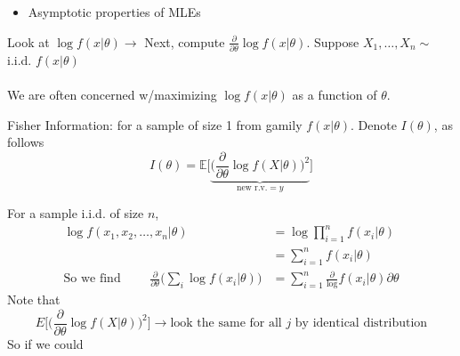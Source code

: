 \begin{itemize}
	\item Asymptotic properties of MLEs
\end{itemize}
Look at $\log f(x | \theta) \rightarrow$ Next, compute $\frac{\partial}{\partial \theta} \log f(x | \theta)$. \quad Suppose $X_1, \ldots, X_n \sim$ i.i.d. $f(x|\theta)$\\\\
We are often concerned w/maximizing $\log f(x|\theta)$ as a function of $\theta$.
\begin{definition}
	Fisher Information: for a sample of size 1 from gamily $f(x| \theta)$. Denote $I(\theta)$, as follows
	\begin{equation*}
		I(\theta) = \mathbb{E} \bigg[ \underbrace{\bigg( \frac{\partial}{\partial \theta} \log f(X | \theta) \bigg)^2}_{\text{new r.v.} = y} \bigg]
	\end{equation*}
\end{definition}
For a sample i.i.d. of size $n$, 
\begin{align*}
	\log f(x_1, x_2, \ldots, x_n | \theta) & = \log \prod_{i=1}^n f(x_i | \theta)\\
	& = \sum_{i=1}^n f(x_i | \theta)\\
	\text{So we find } \qquad \frac{\partial}{\partial \theta} \bigg( \sum_i \log f(x_i | \theta) \bigg) & = \sum_{i=1}^n \frac{\partial} \log f(x_i | \theta){\partial \theta}
\end{align*}
Note that
\begin{equation*}
	E \bigg[ \bigg( \frac{\partial}{\partial \theta} \log f(X | \theta) \bigg)^2 \bigg] \rightarrow \text{look the same for all $j$ by identical distribution}
\end{equation*}
So if we could 
